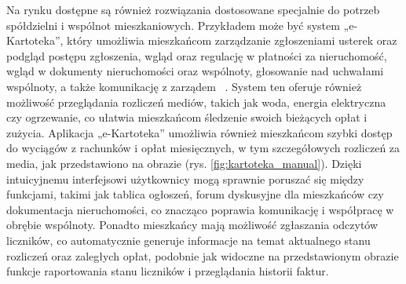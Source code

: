 Na rynku dostępne są również rozwiązania dostosowane specjalnie do potrzeb spółdzielni i wspólnot mieszkaniowych. Przykładem może być system „e-Kartoteka”, który umożliwia mieszkańcom zarządzanie zgłoszeniami usterek oraz podgląd postępu zgłoszenia, wgląd oraz regulację w płatności za nieruchomość, wgląd w dokumenty nieruchomości oraz wspólnoty, głosowanie nad uchwałami wspólnoty, a także komunikację z zarządem ~\cite{e-kartoteka}. System ten oferuje również możliwość przeglądania rozliczeń mediów, takich jak woda, energia elektryczna czy ogrzewanie, co ułatwia mieszkańcom śledzenie swoich bieżących opłat i zużycia. Aplikacja „e-Kartoteka” umożliwia również mieszkańcom szybki dostęp do wyciągów z rachunków i opłat miesięcznych, w tym szczegółowych rozliczeń za media, jak przedstawiono na obrazie (rys. \ref{fig:kartoteka_manual}). Dzięki intuicyjnemu interfejsowi użytkownicy mogą sprawnie poruszać się między funkcjami, takimi jak tablica ogłoszeń, forum dyskusyjne dla mieszkańców czy dokumentacja nieruchomości, co znacząco poprawia komunikację i współpracę w obrębie wspólnoty. Ponadto mieszkańcy mają możliwość zgłaszania odczytów liczników, co automatycznie generuje informacje na temat aktualnego stanu rozliczeń oraz zaległych opłat, podobnie jak widoczne na przedstawionym obrazie funkcje raportowania stanu liczników i przeglądania historii faktur.

